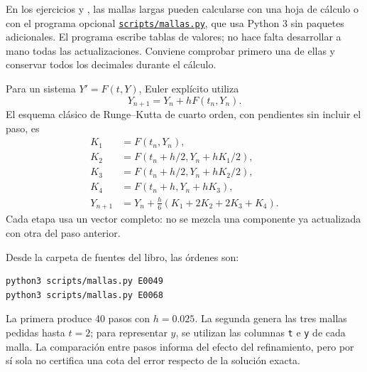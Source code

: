 En los ejercicios  y , las mallas largas pueden calcularse con una hoja de cálculo o con el programa opcional \href{https://github.com/gioda/ecuaciones-diferenciales/blob/main/scripts/mallas.py}{\texttt{scripts/mallas.py}}, que usa Python 3 sin paquetes adicionales. El programa escribe tablas de valores; no hace falta desarrollar a mano todas las actualizaciones. Conviene comprobar primero una de ellas y conservar todos los decimales durante el cálculo.

Para un sistema \(Y'=F(t,Y)\), Euler explícito utiliza
\[
Y_{n+1}=Y_n+hF(t_n,Y_n).
\]
El esquema clásico de Runge--Kutta de cuarto orden, con pendientes sin incluir el paso, es
\[
\begin{aligned}
K_1&=F(t_n,Y_n),\\
K_2&=F(t_n+h/2,Y_n+hK_1/2),\\
K_3&=F(t_n+h/2,Y_n+hK_2/2),\\
K_4&=F(t_n+h,Y_n+hK_3),\\
Y_{n+1}&=Y_n+\frac h6(K_1+2K_2+2K_3+K_4).
\end{aligned}
\]
Cada etapa usa un vector completo: no se mezcla una componente ya actualizada con otra del paso anterior.

Desde la carpeta de fuentes del libro, las órdenes son:
\begin{verbatim}
python3 scripts/mallas.py E0049
python3 scripts/mallas.py E0068
\end{verbatim}
La primera produce 40 pasos con \(h=0.025\). La segunda genera las tres mallas pedidas hasta \(t=2\); para representar \(y\), se utilizan las columnas \texttt{t} e \texttt{y} de cada malla. La comparación entre pasos informa del efecto del refinamiento, pero por sí sola no certifica una cota del error respecto de la solución exacta.
